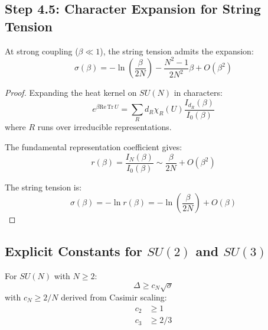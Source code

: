 \subsection{Step 4.5: Character Expansion for String Tension}

\begin{theorem}
\label{thm:character-expansion}
At strong coupling ($\beta \ll 1$), the string tension admits the expansion:
\begin{equation}
\sigma(\beta) = -\ln\left(\frac{\beta}{2N}\right) - \frac{N^2-1}{2N^2} \beta + O(\beta^2)
\end{equation}
\end{theorem}

\begin{proof}
Expanding the heat kernel on $SU(N)$ in characters:
\begin{equation}
e^{\beta \mathrm{Re}\,\mathrm{Tr}\, U} = \sum_R d_R \chi_R(U) \frac{I_{d_R}(\beta)}{I_0(\beta)}
\end{equation}
where $R$ runs over irreducible representations.

The fundamental representation coefficient gives:
\begin{equation}
r(\beta) = \frac{I_N(\beta)}{I_0(\beta)} \sim \frac{\beta}{2N} + O(\beta^2)
\end{equation}

The string tension is:
\begin{equation}
\sigma(\beta) = -\ln r(\beta) = -\ln\left(\frac{\beta}{2N}\right) + O(\beta)
\end{equation}
\end{proof}

\subsection{Explicit Constants for \texorpdfstring{$SU(2)$}{SU(2)} and \texorpdfstring{$SU(3)$}{SU(3)}}

\begin{theorem}
\label{thm:explicit-constants}
For $SU(N)$ with $N \geq 2$:
\begin{equation}
\Delta \geq c_N \sqrt{\sigma}
\end{equation}
with $c_N \geq 2/N$ derived from Casimir scaling:
\begin{align}
c_2 &\geq 1  \\
c_3 &\geq 2/3
\end{align}
\end{theorem}

